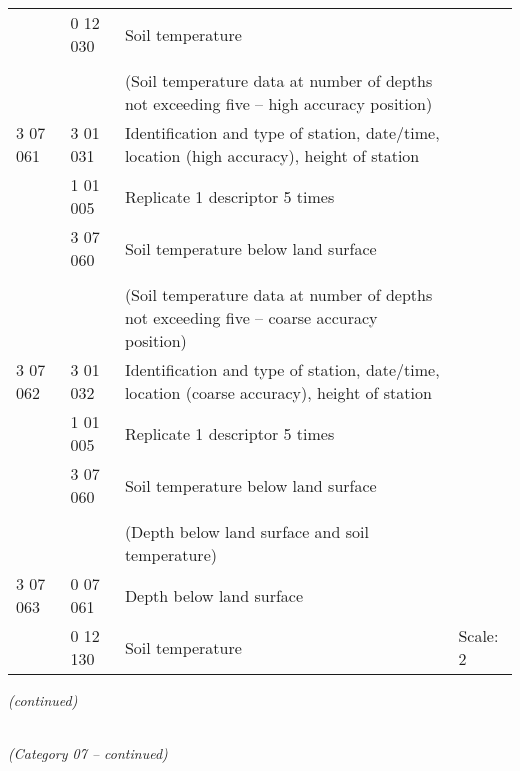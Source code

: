 \begin{longtable}[]{@{}llll@{}}
& 0 12 030 & Soil temperature &\tabularnewline
& & &\tabularnewline
& & (Soil temperature data at number of depths not exceeding five -- high accuracy position) &\tabularnewline
3 07 061 & 3 01 031 & Identification and type of station, date/time, location (high accuracy), height of station &\tabularnewline
& 1 01 005 & Replicate 1 descriptor 5 times &\tabularnewline
& 3 07 060 & Soil temperature below land surface &\tabularnewline
& & &\tabularnewline
& & (Soil temperature data at number of depths not exceeding five -- coarse accuracy position) &\tabularnewline
3 07 062 & 3 01 032 & Identification and type of station, date/time, location (coarse accuracy), height of station &\tabularnewline
& 1 01 005 & Replicate 1 descriptor 5 times &\tabularnewline
& 3 07 060 & Soil temperature below land surface &\tabularnewline
& & &\tabularnewline
& & (Depth below land surface and soil temperature) &\tabularnewline
3 07 063 & 0 07 061 & Depth below land surface &\tabularnewline
& 0 12 130 & Soil temperature & Scale: 2\tabularnewline
\bottomrule
\end{longtable}

\emph{(continued)}

\emph{\\
(Category 07 -- continued)}


